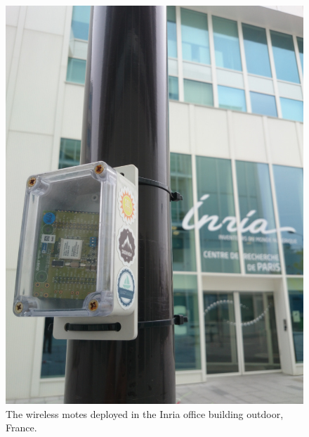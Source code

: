 \documentclass{elsarticle}
\begin{document}
\begin{figure}
    \hfill
    \begin{minipage}[t]{0.48\textwidth}
        \centering
        \includegraphics[width=\textwidth]{smartbuilding_outdoor}
        \caption{The wireless motes deployed in the Inria office building outdoor, France.\newline}
        \label{fig:peach_map}
    \end{minipage}
    \hfill
    \begin{minipage}[t]{0.48\textwidth}

\end{minipage}
\end{figure}
\end{document}
